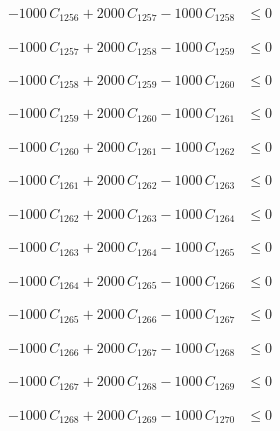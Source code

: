 \documentclass[a4paper,11pt]{article}
\begin{document}
\begin{align}
-1000\,C_{1256} + 2000\,C_{1257} - 1000\,C_{1258} &\leq 0 \nonumber
\end{align}

\begin{align}
-1000\,C_{1257} + 2000\,C_{1258} - 1000\,C_{1259} &\leq 0 \nonumber
\end{align}

\begin{align}
-1000\,C_{1258} + 2000\,C_{1259} - 1000\,C_{1260} &\leq 0 \nonumber
\end{align}

\begin{align}
-1000\,C_{1259} + 2000\,C_{1260} - 1000\,C_{1261} &\leq 0 \nonumber
\end{align}

\begin{align}
-1000\,C_{1260} + 2000\,C_{1261} - 1000\,C_{1262} &\leq 0 \nonumber
\end{align}

\begin{align}
-1000\,C_{1261} + 2000\,C_{1262} - 1000\,C_{1263} &\leq 0 \nonumber
\end{align}

\begin{align}
-1000\,C_{1262} + 2000\,C_{1263} - 1000\,C_{1264} &\leq 0 \nonumber
\end{align}

\begin{align}
-1000\,C_{1263} + 2000\,C_{1264} - 1000\,C_{1265} &\leq 0 \nonumber
\end{align}

\begin{align}
-1000\,C_{1264} + 2000\,C_{1265} - 1000\,C_{1266} &\leq 0 \nonumber
\end{align}

\begin{align}
-1000\,C_{1265} + 2000\,C_{1266} - 1000\,C_{1267} &\leq 0 \nonumber
\end{align}

\begin{align}
-1000\,C_{1266} + 2000\,C_{1267} - 1000\,C_{1268} &\leq 0 \nonumber
\end{align}

\begin{align}
-1000\,C_{1267} + 2000\,C_{1268} - 1000\,C_{1269} &\leq 0 \nonumber
\end{align}

\begin{align}
-1000\,C_{1268} + 2000\,C_{1269} - 1000\,C_{1270} &\leq 0 \nonumber
\end{align}
\end{document}
